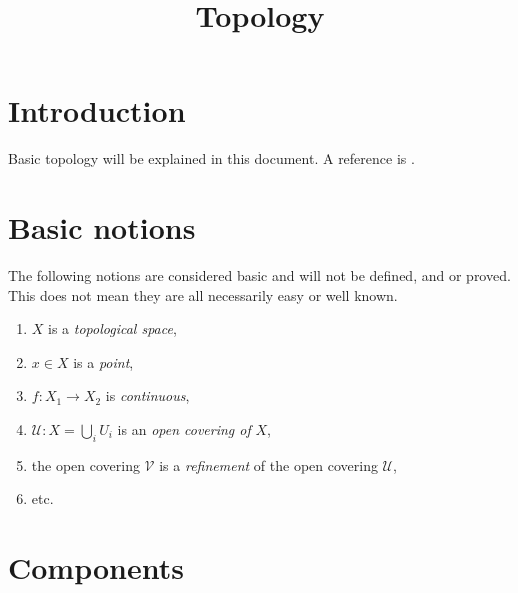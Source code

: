 

%


\title{Topology}


\maketitle

\tableofcontents

\section{Introduction}
\label{section-introduction}

\noindent
Basic topology will be explained in this document.
A reference is \cite{Engelking}.

\section{Basic notions}
\label{section-topology-basic}

\noindent
The following notions are considered basic and will not be defined,
and or proved. This does not mean they are all necessarily easy or 
well known.

\begin{enumerate}
\item $X$ is a {\it topological space},
\label{space}
\item $x\in X$ is a {\it point},
\label{point}
\item $f : X_1 \to X_2$ is {\it continuous},
\label{continuous}
\item $\mathcal{U} : X = \bigcup_i U_i$ is an {\it open covering of} $X$,
\label{covering}
\item the open covering $\mathcal{V}$ is a {\it refinement}
of the open covering $\mathcal{U}$,
\item etc.
\end{enumerate}

\section{Components}
\label{section-components}

